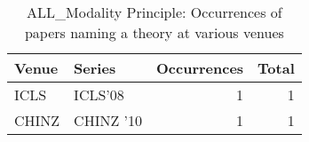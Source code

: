 \begin{table*}[t]
\begin{tabular}{llrr}
Venue & Series & Occurrences & Total\\\hline
\multirow{1}{*}{ICLS} & ICLS'08 & 1 & \multirow{1}{*}{1}\\
\multirow{1}{*}{CHINZ } & CHINZ '10 & 1 & \multirow{1}{*}{1}\\
\end{tabular}
\caption{ALL\_Modality Principle: Occurrences of papers naming a theory at various venues}
\end{table*}